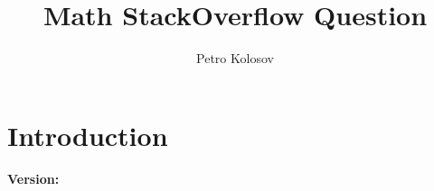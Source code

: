 \documentclass[12pt,letterpaper,oneside,reqno]{amsart}
\title[Math StackOverflow Question]
{Math StackOverflow Question}
\author[Petro Kolosov]{Petro Kolosov}
\begin{document}
%        

    \maketitle

    \section{Introduction} \label{sec:introduction}
    

    \noindent \textbf{Version:} 
\end{document}
